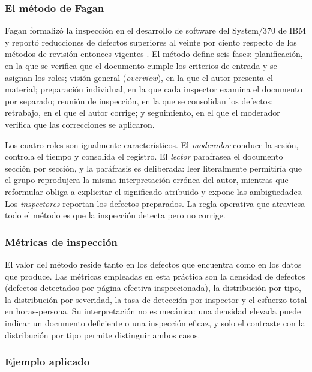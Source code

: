 \documentclass[11pt,letterpaper]{article}
\begin{document}
\subsubsection*{El método de Fagan}

Fagan formalizó la inspección en el desarrollo de software del System/370 de IBM y reportó
reducciones de defectos superiores al veinte por ciento respecto de los métodos de revisión
entonces vigentes \cite{fagan1976}. El método define seis fases: planificación, en la que se verifica
que el documento cumple los criterios de entrada y se asignan los roles; visión general
(\emph{overview}), en la que el autor presenta el material; preparación individual, en la que cada
inspector examina el documento por separado; reunión de inspección, en la que se consolidan los
defectos; retrabajo, en el que el autor corrige; y seguimiento, en el que el moderador verifica que
las correcciones se aplicaron.

Los cuatro roles son igualmente característicos. El \emph{moderador} conduce la sesión, controla el
tiempo y consolida el registro. El \emph{lector} parafrasea el documento sección por sección, y la
paráfrasis es deliberada: leer literalmente permitiría que el grupo reprodujera la misma
interpretación errónea del autor, mientras que reformular obliga a explicitar el significado
atribuido y expone las ambigüedades. Los \emph{inspectores} reportan los defectos preparados. La
regla operativa que atraviesa todo el método es que la inspección detecta pero no corrige.

\subsubsection*{Métricas de inspección}

El valor del método reside tanto en los defectos que encuentra como en los datos que produce. Las
métricas empleadas en esta práctica son la densidad de defectos (defectos detectados por página
efectiva inspeccionada), la distribución por tipo, la distribución por severidad, la tasa de
detección por inspector y el esfuerzo total en horas-persona. Su interpretación no es mecánica: una
densidad elevada puede indicar un documento deficiente o una inspección eficaz, y solo el contraste
con la distribución por tipo permite distinguir ambos casos.

\subsubsection*{Ejemplo aplicado}
\end{document}
